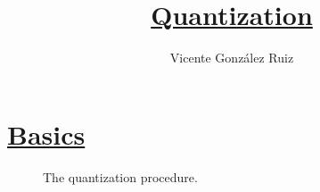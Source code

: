 
\title{\href{https://github.com/vicente-gonzalez-ruiz/quantization}{Quantization}}

\author{Vicente González Ruiz}

\maketitle

\section{\href{https://en.wikipedia.org/wiki/Quantization\_(signal\_processing)}{Basics}}

\begin{figure}
  \caption{The quantization procedure.}
  \label{fig:cuantif}
\end{figure}

